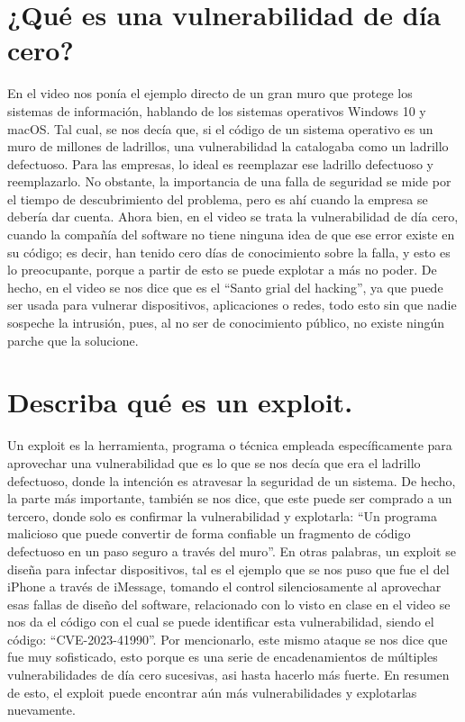 \documentclass[letterpaper,11pt]{article}
\begin{document}


\newpage

{\hypersetup{linkcolor=black}\tableofcontents}
\thispagestyle{estiloindice}


\newpage

\thispagestyle{fancy}
\setcounter{page}{1}
\singlespacing

\section{¿Qué es una vulnerabilidad de día cero?}
En el video nos ponía el ejemplo directo 
de un gran muro que protege los sistemas de información, hablando de los 
sistemas operativos Windows 10 y macOS. 
Tal cual, se nos decía que, si 
el código de un sistema operativo 
es un muro de millones de ladrillos, 
una vulnerabilidad la catalogaba como un ladrillo defectuoso. Para las empresas, 
lo ideal es reemplazar ese ladrillo defectuoso y reemplazarlo. No obstante, la importancia 
de una falla de seguridad se mide por el tiempo de descubrimiento del problema,
pero es ahí cuando la empresa se debería dar cuenta. Ahora bien, 
en el video se trata la
vulnerabilidad de día cero, cuando 
la compañía del software no tiene ninguna 
idea de que ese error 
existe en su código; 
es decir, han tenido cero días 
de conocimiento sobre la falla, y esto es lo preocupante, porque 
a partir de esto se puede explotar a más no poder. De hecho, en el video 
se nos dice que es el ``Santo grial del hacking'', ya que puede ser usada para vulnerar dispositivos, aplicaciones o redes, todo esto
sin que nadie sospeche la intrusión, 
pues, al no ser de conocimiento público, no existe ningún parche que la solucione.

\section{Describa qué es un exploit.}
Un exploit es la herramienta, 
programa o técnica empleada específicamente 
para aprovechar una vulnerabilidad 
que es lo que se nos decía que era el ladrillo defectuoso,  
donde la intención es atravesar 
la seguridad de un sistema. De hecho, la parte más importante, también se nos dice, 
que este puede ser comprado a un tercero, donde solo es confirmar la vulnerabilidad 
y explotarla: ``Un programa malicioso que puede convertir de forma confiable un fragmento 
de código defectuoso en un paso seguro a través del muro''. 
En otras palabras, un exploit 
se diseña para infectar 
dispositivos, tal es el ejemplo que se nos puso que fue el 
del iPhone a través de iMessage, tomando el control silenciosamente al 
aprovechar esas fallas de diseño del software, relacionado con lo visto en clase 
en el video se nos da el código con el cual se puede identificar esta vulnerabilidad, siendo el código:
``CVE-2023-41990''. 
Por mencionarlo, este mismo ataque 
se nos dice que fue muy sofisticado, 
esto porque es una serie de encadenamientos de  
múltiples vulnerabilidades de día cero sucesivas, asi hasta hacerlo 
más fuerte. En resumen de esto, el exploit puede encontrar aún más vulnerabilidades
y explotarlas nuevamente.
\end{document}
